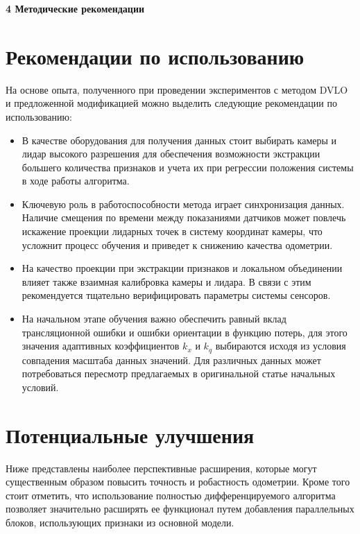 \newpage
\begin{center}
  \textbf{\large 4 Методические рекомендации}
\end{center}

\section{Рекомендации по использованию}
На основе опыта, полученного при проведении экспериментов с методом DVLO и предложенной модификацией 
можно выделить следующие рекомендации по использованию:
\begin{itemize}
  \item В качестве оборудования для получения данных стоит выбирать камеры и лидар высокого 
  разрешения для обеспечения возможности экстракции большего количества признаков 
  и учета их при регрессии положения системы в ходе работы алгоритма.
  \item Ключевую роль в работоспособности метода играет синхронизация данных. Наличие
  смещения по времени между показаниями датчиков может повлечь искажение проекции лидарных точек в 
  систему координат камеры, что усложнит процесс обучения и приведет к снижению качества одометрии.
  \item На качество проекции при экстракции признаков и локальном объединении влияет также взаимная 
  калибровка камеры и лидара. В связи с этим рекомендуется тщательно верифицировать параметры системы сенсоров.
  \item На начальном этапе обучения важно обеспечить равный вклад трансляционной ошибки и ошибки ориентации в 
  функцию потерь, для этого значения адаптивных коэффициентов $k_x$ и $k_q$ выбираются исходя из условия совпадения 
  масштаба  данных значений. Для различных данных может потребоваться пересмотр предлагаемых в оригинальной статье начальных условий.
\end{itemize}

\section{Потенциальные улучшения}
\label{sec:future_work}

Ниже представлены наиболее перспективные расширения,
которые могут существенным образом повысить точность и робастность одометрии. 
Кроме того стоит отметить, что использование полностью дифференцируемого алгоритма 
позволяет значительно расширять ее функционал путем добавления параллельных блоков, 
использующих признаки из основной модели.

